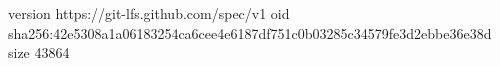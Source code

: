 version https://git-lfs.github.com/spec/v1
oid sha256:42e5308a1a06183254ca6cee4e6187df751c0b03285c34579fe3d2ebbe36e38d
size 43864
